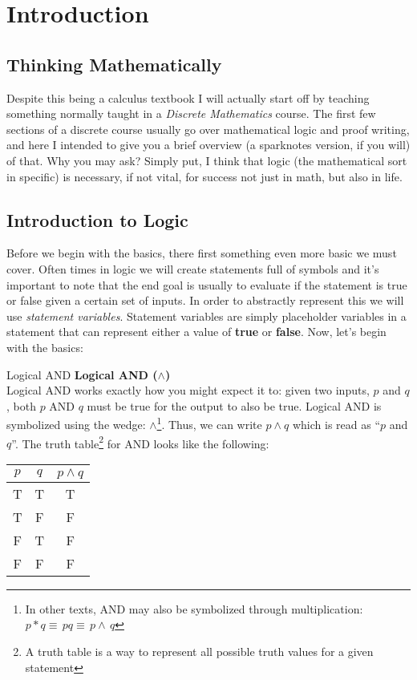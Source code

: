\section{Introduction}
\subsection{Thinking Mathematically}

Despite this being a calculus textbook I will actually start off by teaching something normally taught in a \textit{Discrete Mathematics} course. The first few sections of a discrete course usually go over mathematical logic and proof writing, and here I intended to give you a brief overview (a sparknotes version, if you will) of that. Why you may ask? Simply put, I think that logic (the mathematical sort in specific) is necessary, if not vital, for success not just in math, but also in life.

\subsection{Introduction to Logic}
Before we begin with the basics, there first something even more basic we must cover. Often times in logic we will create statements full of symbols and it's important to note that the end goal is usually to evaluate if the statement is true or false given a certain set of inputs. In order to abstractly represent this we will use \textit{statement variables}. Statement variables are simply placeholder variables in a statement that can represent either a value of \textbf{true} or \textbf{false}. Now, let's begin with the basics:
\begin{definition}{Logical AND}{}
  \large\textbf{Logical AND ($\land$)} \\
  \normalsize Logical AND works exactly how you might expect it to: given two inputs, $p$ and $q$, both $p$ AND $q$ must be true for the output to also be true. Logical AND is symbolized using the wedge: $\land$\footnote{In other texts, AND may also be symbolized through multiplication: $p*q\equiv\,pq\equiv\,p\land\,q$}. Thus, we can write $p \land q$ which is read as ``$p$ and $q$''. The truth table\footnote{A truth table is a way to represent all possible truth values for a given statement} for AND looks like the following:
  \vspace{0.01in}
  \begin{center}
    \begin{tabular}{ |c|c|c| } 
      \hline
      $p$ & $q$ & $p \land q$ \\ 
      \hline
      T & T & T \\ 
      T & F & F \\ 
      F & T & F \\ 
      F & F & F \\ 
      \hline
    \end{tabular}
  \end{center}
  \vspace{0.01in}
\end{definition}

